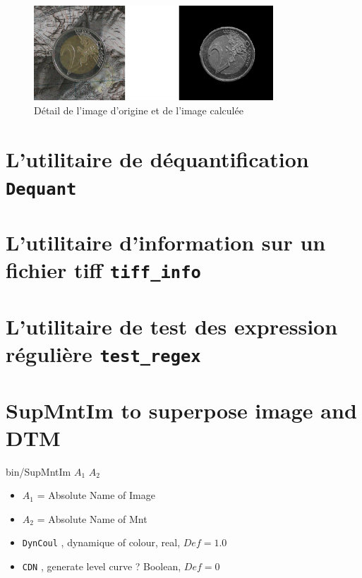 \begin{figure}[h!]
\centering
\includegraphics[width=0.8\textwidth]{FIGS/LumRas/LumRasExample.png}
\caption{D\'etail de l'image d'origine et de l'image calcul\'ee}
\end{figure}


\section{L'utilitaire de d\'equantification  {\tt Dequant}}


\section{L'utilitaire d'information sur un fichier tiff {\tt tiff\_info}}



\section{L'utilitaire  de test des expression r\'eguli\`ere {\tt test\_regex}}




\section{SupMntIm to superpose image and DTM}


bin/SupMntIm $A_1$ $A_2$

\begin{itemize}
    \item $A_1$ = Absolute Name of Image
    \item $A_2$ = Absolute Name of Mnt
    \item {\tt DynCoul} , dynamique of colour, real, $Def=1.0$
    \item {\tt CDN} , generate level curve ?  Boolean, $Def=0$
\end{itemize}






